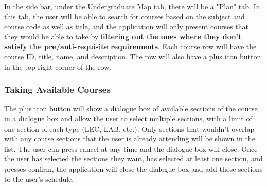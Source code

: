\documentclass[12pt, a4paper]{article}
\begin{document}
In the side bar, under the Undergraduate Map tab, there will be a "Plan" tab. In this tab, the user will be able to search for courses based on the subject and course code as well as title, and the application will only present courses that they would be able to take by \textbf{filtering out the ones where they don't satisfy the pre/anti-requisite requirements}. Each course row will have the course ID, title, name, and description. The row will also have a plus icon button in the top right corner of the row.
\subsubsection*{Taking Available Courses}
The plus icon button will show a dialogue box of available sections of the course in a dialogue box and allow the user to select multiple sections, with a limit of one section of each type (LEC, LAB, etc.). Only sections that wouldn't overlap with any course sections that the user is already attending will be shown in the list. The user can press cancel at any time and the dialogue box will close. Once the user has selected the sections they want, has selected at least one section, and presses confirm, the application will close the dialogue box and add those sections to the user's schedule.
\end{document}

